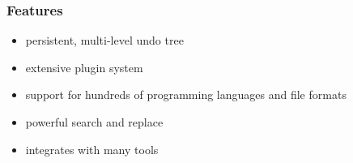 \begin{frame}[fragile]
  \frametitle{Features}
  \begin{itemize}
    \item persistent, multi-level undo tree
    \item extensive plugin system
    \item support for hundreds of programming languages and file formats
    \item powerful search and replace
    \item integrates with many tools
  \end{itemize}
\end{frame}
